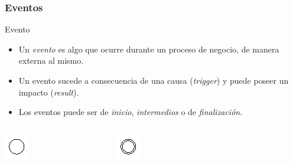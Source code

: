\documentclass[handout,a4paper,slidestop,xcolor=pst,blue]{beamer}
\begin{document}
\begin{frame}[t]
    \frametitle{Eventos}
    \begin{block}{Evento}
        \begin{itemize}[<+->]
            \item Un \alert{\emph{evento}} es algo que ocurre durante un proceso de negocio, de manera externa al mismo. 
            \item Un evento sucede a consecuencia de una causa (\emph{trigger}) y puede poseer un impacto (\emph{result}).
            \item Los eventos puede ser de \emph{inicio}, \emph{intermedios} o de \emph{finalización}.
        \end{itemize}
        \vspace{-15pt}
        \begin{columns}
        \begin{column}{0.33\textwidth}
            \begin{center}
                \includegraphics[width=0.35\columnwidth]{images/symbols/startEvent.eps}
            \end{center}
        \end{column}
        \begin{column}{0.33\textwidth}
            \begin{center}
                \includegraphics[width=0.35\columnwidth]{images/symbols/intermediateEvent.eps}
            \end{center}
        \end{column}
        \begin{column}{0.33\textwidth}

\end{column}
\end{columns}
\end{block}
\end{frame}
\end{document}
